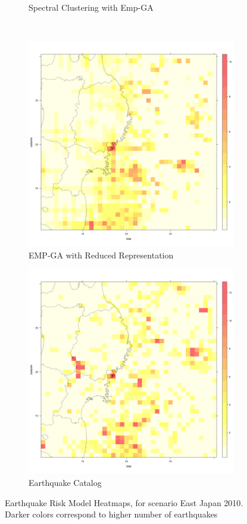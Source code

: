 \begin{figure}
\begin{subfigure}{.5\textwidth}
  \caption{Spectral Clustering with Emp-GA}
  \label{fig:sub2}
\end{subfigure}\\
\begin{subfigure}{.5\textwidth}
  \centering
  \includegraphics[width=1\linewidth]{img/EMP-RED-ga}
  \caption{EMP-GA with Reduced Representation}
  \label{fig:sub3}
\end{subfigure}%
\begin{subfigure}{.5\textwidth}
  \centering
  \includegraphics[width=1\linewidth]{img/realEastJapan_2010}
  \caption{Earthquake Catalog}
  \label{fig:sub4}
\end{subfigure}
\caption{Earthquake Risk Model Heatmaps, for scenario East Japan
  2010. Darker colors correspond to higher number of earthquakes}
\label{fig:heatmap}
\end{figure}

